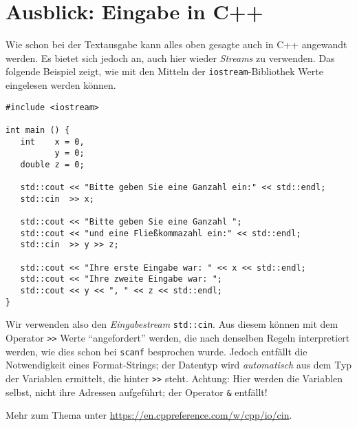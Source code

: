 \section{Ausblick: Eingabe in C++}
\begin{plusbox}
Wie schon bei der Textausgabe kann alles oben gesagte auch in C++ angewandt werden. Es bietet sich jedoch an, auch hier wieder \emph{Streams} zu verwenden. Das folgende Beispiel zeigt, wie mit den Mitteln der \texttt{iostream}-Bibliothek Werte eingelesen werden können.

\begin{codebox}
\begin{verbatim}
#include <iostream>

int main () {
   int    x = 0,
          y = 0;
   double z = 0;

   std::cout << "Bitte geben Sie eine Ganzahl ein:" << std::endl;
   std::cin  >> x;

   std::cout << "Bitte geben Sie eine Ganzahl ";
   std::cout << "und eine Fließkommazahl ein:" << std::endl;
   std::cin  >> y >> z;

   std::cout << "Ihre erste Eingabe war: " << x << std::endl;
   std::cout << "Ihre zweite Eingabe war: ";
   std::cout << y << ", " << z << std::endl;
}
\end{verbatim}
\end{codebox}

Wir verwenden also den \emph{Eingabestream} \texttt{std::cin}. Aus diesem können mit dem Operator \texttt{>{}>} Werte \enquote{angefordert} werden, die nach denselben Regeln interpretiert werden, wie dies schon bei \texttt{scanf} besprochen wurde. Jedoch entfällt die Notwendigkeit eines Format-Strings; der Datentyp wird \emph{automatisch} aus dem Typ der Variablen ermittelt, die hinter \texttt{>{}>} steht. Achtung: Hier werden die Variablen selbst, nicht ihre Adressen aufgeführt; der Operator \texttt{\&} entfällt!

Mehr zum Thema unter \url{https://en.cppreference.com/w/cpp/io/cin}.
\end{plusbox}
